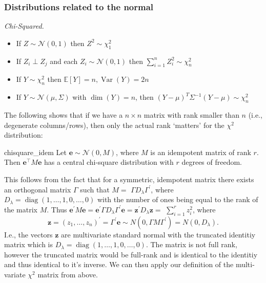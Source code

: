 \documentclass[11pt, %
	oneside, %
	english, %
	onehalfspacing, %
	]{article} %
\numberwithin{equation}{section}
\begin{document}
\subsubsection{Distributions related to the normal}

\emph{Chi-Squared.}

\begin{itemize}
    \item If $Z \sim \mathcal{N}(0,1)$ then $Z^2 \sim \chi_1^2$
    \item If $Z_i \perp Z_j$ and each $Z_i \sim \mathcal{N}(0,1)$ then $\sum_{ i=1 }^{ n } Z_i^2 \sim\chi_n^2$
    \item If $Y \sim \chi^2_n$ then $\mathbb{E} \left[ Y\right] = n, \operatorname{Var} \left( Y\right) = 2n$
    \item If $Y \sim \mathcal{N}(\mu, \Sigma)$ with $\operatorname{dim}(Y) = n$, then $(Y- \mu)^T \Sigma^{-1} (Y-\mu) \sim \chi^2_n$
\end{itemize}


The following shows that if we have a $n \times n$  matrix with rank smaller than $n$ (i.e., degenerate columns/rows), then only the actual rank `matters' for the $\chi^2$ distribution:

\begin{lemma}{}{chisquare_idem}
    Let $\mathbf{e} \sim \mathcal{N}(0, M)$, where $M$ is an idempotent matrix of rank $r$. Then $\mathbf{e}^{\top} M \mathbf{e}$ has a central chi-square distribution with $r$ degrees of freedom.
\end{lemma}

This follows from the fact that for a symmetric, idempotent matrix there exists an orthogonal matrix $\Gamma$ such that $M=$ $\Gamma D_\lambda \Gamma^{\prime}$, where $D_\lambda=\operatorname{diag}(1, \ldots, 1,0, \ldots, 0)$ with the number of ones being equal to the rank of the matrix $M$. Thus $\mathbf{e}^{\prime} M \mathbf{e}=\mathbf{e}^{\prime} \Gamma D_\lambda \Gamma^{\prime} \mathbf{e}=\mathbf{z}^{\prime} D_\lambda \mathbf{z}=$ $\sum_{i=1}^r z_i^2$, where
$$
\mathbf{z}=\left(z_1, \ldots, z_n\right)^{\prime}=\Gamma^{\prime} \mathbf{e} \sim N\left(0, \Gamma M \Gamma^{\prime}\right)=N\left(0, D_\lambda\right).
$$
I.e., the vectors $\mathbf{z}$ are multivariate standard normal with the truncated identitiy matrix which is $D_\lambda=\operatorname{diag}(1, \ldots, 1,0, \ldots, 0)$. The matrix is not full rank, however the truncated matrix would be full-rank and is identical to the identitiy and thus identical to it's inverse. We can thsu apply our definition of the multi-variate $\chi^2$ matrix from above.
\end{document}
